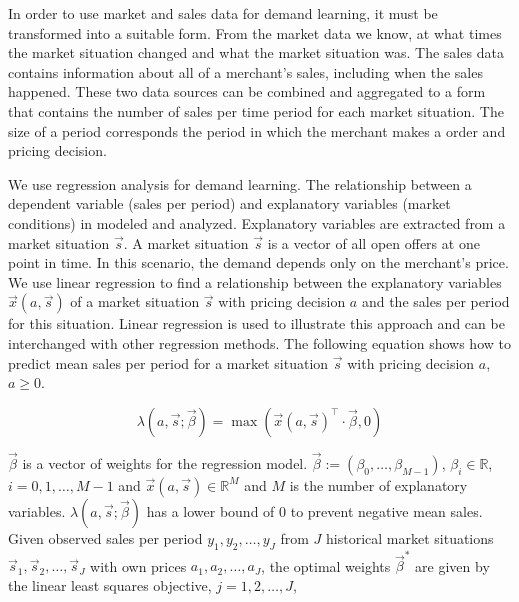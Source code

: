 In order to use market and sales data for demand learning, it must be transformed into a suitable form.
From the market data we know, at what times the market situation changed and what the market situation was.
The sales data contains information about all of a merchant's sales, including when the sales happened.
These two data sources can be combined and aggregated to a form that contains the number of sales per time period for each market situation.
The size of a period corresponds the period in which the merchant makes a order and pricing decision.

We use regression analysis for demand learning.
The relationship between a dependent variable (sales per period) and explanatory variables (market conditions) in modeled and analyzed.
Explanatory variables are extracted from a market situation $\vec{s}$.
A market situation $\vec{s}$ is a vector of all open offers at one point in time.
In this scenario, the demand depends only on the merchant's price.
We use linear regression to find a relationship between the explanatory variables $\vec{x}(a, \vec{s})$ of a market situation $\vec{s}$ with pricing decision $a$ and the sales per period for this situation.
Linear regression is used to illustrate this approach and can be interchanged with other regression methods.
The following equation shows how to predict mean sales per period for a market situation $\vec{s}$ with pricing decision $a$, $a\geq 0$.

\begin{equation}
\label{eq:linear_regression}
\lambda(a, \vec{s}; \vec{\beta}) = \max(\vec{x}(a,\vec{s})^\intercal \cdot \vec{\beta}, 0)
\end{equation}

$\vec{\beta}$ is a vector of weights for the regression model.
$\vec{\beta} := (\beta_0, \ldots, \beta_{M-1})$, $\beta_i \in \mathbb{R}$, $i=0, 1, \ldots, M-1$ and $\vec{x}(a,\vec{s}) \in \mathbb{R}^M$ and $M$ is the number of explanatory variables.
$\lambda(a,\vec{s}; \vec{\beta})$ has a lower bound of 0 to prevent negative mean sales.
Given observed sales per period $y_1, y_2, \ldots, y_J$ from $J$ historical market situations $\vec{s}_1, \vec{s}_2, \ldots, \vec{s}_J$ with own prices $a_1, a_2, \ldots, a_J$, the optimal weights $\vec{\beta}^*$ are given by the linear least squares objective, $j=1, 2, \ldots, J$,

